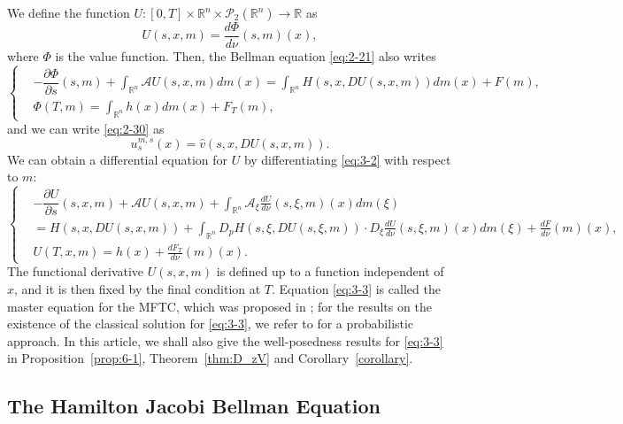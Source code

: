 \documentclass[11pt]{article}
\numberwithin{equation}{section}
\newcommand{\br}{\mathbb{R}}
\newcommand{\pr}{\mathcal{P}}
\newcommand{\brn}{{\mathbb{R}^n}}
\newcommand{\1}{\mbox{1\hspace{-1mm}I}}
\begin{document}
We define the function $U:[0,T]\times\brn\times\pr_2(\brn)\to\br$ as 
\begin{equation*}
    U(s,x,m)=\dfrac{d\Phi}{d\nu}(s,m)(x), \label{eq:3-1}
\end{equation*}
where $\Phi$ is the value function. Then, the Bellman equation \eqref{eq:2-21} also writes
\begin{equation}\label{eq:3-2}
    \left\{
        \begin{aligned}
            &-\dfrac{\partial \Phi}{\partial s}(s,m)+\int_{\brn}\mathcal{A}U(s,x,m)dm(x)=\int_{\brn}H\left(s,x,DU(s,x,m)\right)dm(x)+F(m),\\
            &\Phi(T,m)=\int_{\brn}h(x)dm(x)+F_{T}(m),
        \end{aligned}
    \right.
\end{equation} 
and we can write \eqref{eq:2-30} as 
\begin{equation*}
    u^{m,s}_s(x)=\widehat{v}\left(s,x,DU(s,x,m)\right). \label{eq:3-20}
\end{equation*}
We can obtain a differential equation for $U$ by differentiating \eqref{eq:3-2} with respect to $m$:
\begin{equation}\label{eq:3-3}
    \left\{
        \begin{aligned}
            &-\dfrac{\partial U}{\partial s}(s,x,m)+\mathcal{A}U(s,x,m)+\int_{\brn}\mathcal{A}_\xi \frac{dU}{d\nu}(s,\xi,m)(x)dm(\xi)\\
            &=H\left(s,x,DU(s,x,m)\right)+\int_{\brn}D_p H\left(s,\xi,DU(s,\xi,m)\right)\cdot D_\xi\frac{dU}{d\nu}(s,\xi,m)(x) dm(\xi)+
            \frac{dF}{d\nu}(m)(x),\\
            &U(T,x,m)=h(x)+\frac{dF_T}{d\nu}(m)(x).
        \end{aligned}
    \right.
\end{equation} 
The functional derivative $U(s,x,m)$ is defined up to a function independent of $x$, %
and it is then fixed by the final condition at $T$. Equation \eqref{eq:3-3} is called the master equation for the MFTC, which was proposed in \cite{AB_JMPA}; for the results on the existence of the classical solution for \eqref{eq:3-3}, we refer to \cite{AB10,AB5} for a probabilistic approach. In this article, we shall also give the well-posedness results for \eqref{eq:3-3} in Proposition~\ref{prop:6-1}, Theorem~\ref{thm:D_zV} and Corollary~\ref{corollary}.

\subsection{The Hamilton Jacobi Bellman Equation}
\end{document}
